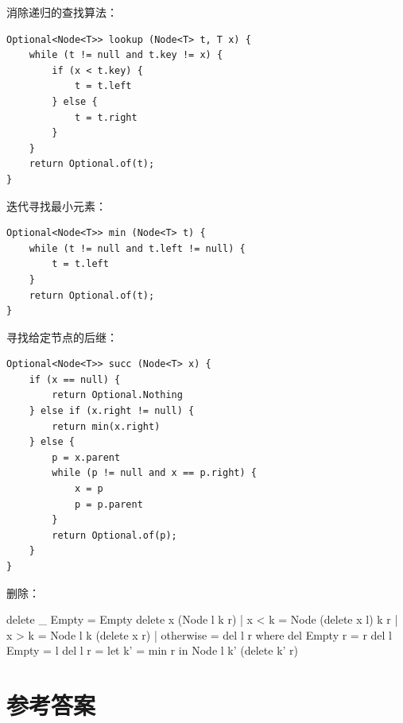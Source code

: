 \documentclass[b5paper]{ctexart}
\begin{document}
消除递归的查找算法：

\begin{lstlisting}
Optional<Node<T>> lookup (Node<T> t, T x) {
    while (t != null and t.key != x) {
        if (x < t.key) {
            t = t.left
        } else {
            t = t.right
        }
    }
    return Optional.of(t);
}
\end{lstlisting}

迭代寻找最小元素：

\begin{lstlisting}
Optional<Node<T>> min (Node<T> t) {
    while (t != null and t.left != null) {
        t = t.left
    }
    return Optional.of(t);
}
\end{lstlisting}

寻找给定节点的后继：

\begin{lstlisting}
Optional<Node<T>> succ (Node<T> x) {
    if (x == null) {
        return Optional.Nothing
    } else if (x.right != null) {
        return min(x.right)
    } else {
        p = x.parent
        while (p != null and x == p.right) {
            x = p
            p = p.parent
        }
        return Optional.of(p);
    }
}
\end{lstlisting}

删除：

\begin{Haskell}
delete _ Empty = Empty
delete x (Node l k r) | x < k = Node (delete x l) k r
                      | x > k = Node l k (delete x r)
                      | otherwise = del l r
  where
    del Empty r = r
    del l Empty = l
    del l r = let k' = min r in Node l k' (delete k' r)
\end{Haskell}

\ifx\wholebook\relax \else
\section{参考答案}
\shipoutAnswer
\end{document}
